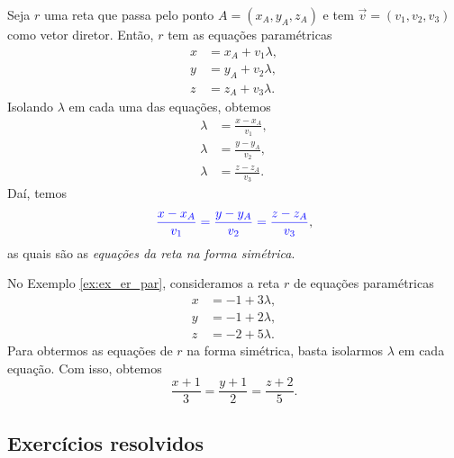 Seja $r$ uma reta que passa pelo ponto $A = (x_A,y_A,z_A)$ e tem $\vec{v} = (v_1,v_2,v_3)$ como vetor diretor. Então, $r$ tem as equações paramétricas
\begin{align}
  x &= x_A + v_1\lambda,\\
  y &= y_A + v_2\lambda,\\
  z &= z_A + v_3\lambda.
\end{align}
Isolando $\lambda$ em cada uma das equações, obtemos
\begin{align}
  \lambda &= \frac{x-x_A}{v_1},\\
  \lambda &= \frac{y-y_A}{v_2},\\
  \lambda &= \frac{z-z_A}{v_3}.
\end{align}
Daí, temos
\begin{equation}
  {\color{blue}\frac{x-x_A}{v_1} = \frac{y-y_A}{v_2} = \frac{z-z_A}{v_3}},
\end{equation}
as quais são as \emph{equações da reta na forma simétrica}.

\begin{ex}
  No Exemplo \ref{ex:ex_er_par}, consideramos a reta $r$ de equações paramétricas
  \begin{align}
    x &= -1 + 3\lambda,\\
    y &= -1 + 2\lambda,\\
    z &= -2 + 5\lambda.    
  \end{align}
  Para obtermos as equações de $r$ na forma simétrica, basta isolarmos $\lambda$ em cada equação. Com isso, obtemos
  \begin{equation}
    \frac{x+1}{3} = \frac{y+1}{2} = \frac{z+2}{5}.
  \end{equation}
\end{ex}

\subsection*{Exercícios resolvidos}

